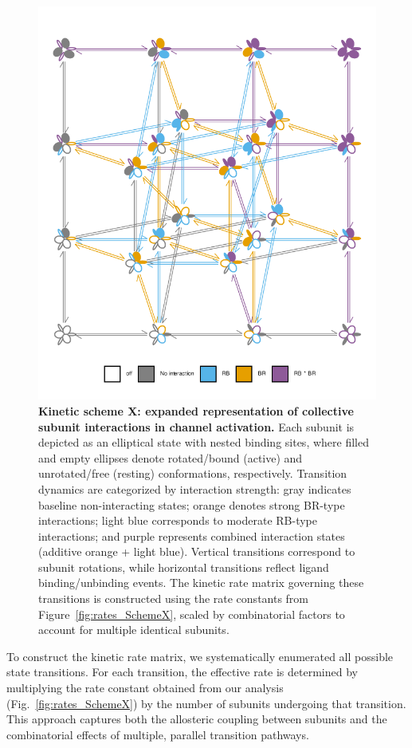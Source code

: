 \documentclass[pdflatex,sn-nature]{sn-jnl}%
\theoremstyle{thmstyleone}%
\theoremstyle{thmstyletwo}%
\theoremstyle{thmstylethree}%
\begin{document}
\begin{figure}[!htbp]
	\centering
	\includegraphics[width=\linewidth]{Figure_4_m.pdf}
	\caption{\textbf{Kinetic scheme X: expanded representation of collective subunit interactions in channel activation.} Each subunit is depicted as an elliptical state with nested binding sites, where filled and empty ellipses denote rotated/bound (active) and unrotated/free (resting) conformations, respectively. Transition dynamics are categorized by interaction strength: gray indicates baseline non-interacting states; orange denotes strong BR-type interactions; light blue corresponds to moderate RB-type interactions; and purple represents combined interaction states (additive orange + light blue). Vertical transitions correspond to subunit rotations, while horizontal transitions reflect ligand binding/unbinding events. The kinetic rate matrix governing these transitions is constructed using the rate constants from Figure~\ref{fig:rates_SchemeX}, scaled by combinatorial factors to account for multiple identical subunits.}
	
	\label{fig:SchemeX_full}
\end{figure}
To construct the kinetic rate matrix, we systematically enumerated all possible state transitions. For each transition, the effective rate is determined by multiplying the rate constant obtained from our analysis (Fig.~\ref{fig:rates_SchemeX}) by the number of subunits undergoing that transition. This approach captures both the allosteric coupling between subunits and the combinatorial effects of multiple, parallel transition pathways.
\end{document}
